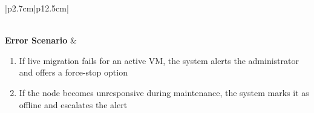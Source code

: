 \begin{table}[H]
\begin{tabular}{|p{2.7cm}|p{12.5cm}|}
\begin{minipage}[t]{\linewidth}
\begin{enumerate}[topsep=0pt,itemsep=1pt,parsep=0pt,partopsep=0pt]
                                      \end{enumerate}
                                  \end{minipage}                 \\
        \hline
        \textbf{Error Scenario} & \begin{minipage}[t]{\linewidth}
                                      \begin{enumerate}[topsep=0pt,itemsep=1pt,parsep=0pt,partopsep=0pt]
                                          \item If live migration fails for an active VM, the system alerts the administrator
                                                and offers a force-stop option
                                          \item If the node becomes unresponsive during maintenance, the system marks it as
                                                offline and escalates the alert
                                      \end{enumerate}
                                  \end{minipage}                   \\
        \hline
    \end{tabular}
    \label{tab:admin-maintenance-mode}
\end{table}
